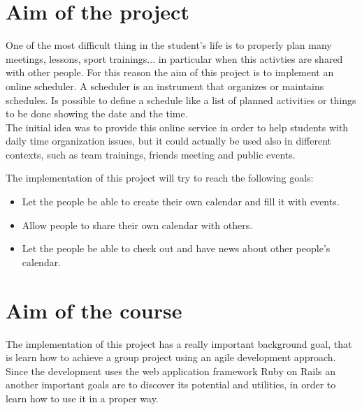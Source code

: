 
\label{Introduction}
\section{Aim of the project}
\vspace{-5mm}
One of the most difficult thing in the student's life is to properly plan many meetings, lessons, sport trainings... in particular when this activties are shared with other people.
For this reason the aim of this project is to implement an online scheduler.
A scheduler is an instrument that organizes or maintains schedules. Is possible to define a schedule like a list of planned activities or things to be done showing the date and the time.\\
The initial idea was to provide this online service in order to help students with daily time organization issues, but it could actually  be used also in different contexts, such as team trainings, friends meeting and public events.

The implementation of this project will try to reach the following goals:
\vspace{-5mm}
\begin{itemize}
 \setlength{\itemsep}{-5pt}
 \item Let the people be able to create their own calendar and fill it with events.
 \item Allow people to share their own calendar with others.
 \item Let the people be able to check out and have news about other people's calendar.
\end{itemize}
\section{Aim of the course}
\vspace{-5mm}
The implementation of this project has a really important background goal, that is learn how to achieve a group project using an agile development approach.\\
Since the development uses the web application framework Ruby on Rails an another important goals are to discover its potential and utilities, in order to learn how to use it in a proper way.